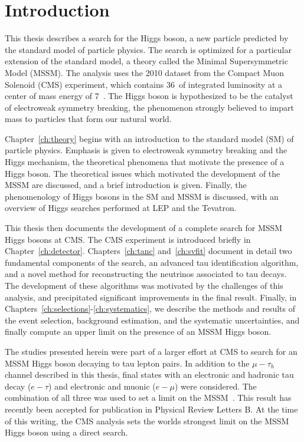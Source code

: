 \ifx\master\undefined\fi
\chapter*{Introduction} 

This thesis describes a search for the Higgs boson, a new particle predicted by
the standard model of particle physics.  The search is optimized for a
particular extension of the standard model, a theory called the Minimal
Supersymmetric Model (MSSM).  The analysis uses the 2010 dataset from the
Compact Muon Solenoid (CMS) experiment, which contains 36~\pbinv of integrated
luminosity at a center of mass energy of 7~\TeV.  The Higgs boson is
hypothesized to be the catalyst of electroweak symmetry breaking, the phenomenon
strongly believed to impart mass to particles that form our natural world.

Chapter~\ref{ch:theory} begins with an introduction to the standard model (SM) of
particle physics. Emphasis is given to electroweak symmetry
breaking and the Higgs mechanism, the theoretical phenomena that motivate the
presence of a Higgs boson.  The theoretical issues which motivated the
development of the MSSM are discussed, and a brief introduction is given.
Finally, the phenomenology of Higgs bosons in the SM and MSSM is discussed, with
an overview of Higgs searches performed at LEP and the Tevatron.

This thesis then documents the development of a complete search for MSSM Higgs
bosons at CMS\@.  The CMS experiment is introduced briefly in
Chapter~\ref{ch:detector}. Chapters~\ref{ch:tanc} and~\ref{ch:svfit} document in
detail two fundamental components of the search, an advanced tau identification
algorithm, and a novel method for reconstructing the neutrinos associated to tau
decays.  The development of these algorithms was motivated by the challenges of
this analysis, and precipitated significant improvements in the final result.
Finally, in \mbox{Chapters~\ref{ch:selections}-\ref{ch:systematics}}, we
describe the methods and results of the event selection, background estimation,
and the systematic uncertainties, and finally compute an upper limit on the
presence of an MSSM Higgs boson.

The studies presented herein were part of a larger effort at CMS to search for
an MSSM Higgs boson decaying to tau lepton pairs.  In addition to the
$\mu-\tau_h$ channel described in this thesis, final states with an electronic
and hadronic tau decay ($e-\tau$) and electronic and muonic ($e-\mu$) were
considered.  The combination of all three was used to set a limit on the
MSSM~\cite{HIG-10-002}.  This result has recently been accepted for publication
in Physical Review Letters B.  At the time of this writing, the CMS analysis
sets the worlds strongest limit on the MSSM Higgs boson using a direct search.
%
\ifx\master\undefined\fi
